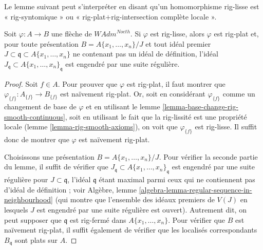 \noindent
Le lemme suivant peut s'interpréter en disant qu'un homomorphisme rig-lisse
est « rig-syntomique » ou « rig-plat$+$rig-intersection complète locale ».

\begin{lemma}
\label{lemma-rig-smooth-rig-flat}
Soit $\varphi : A \to B$ une flèche de $\textit{WAdm}^{Noeth}$.
Si $\varphi$ est rig-lisse, alors $\varphi$ est rig-plat et,
pour toute présentation $B = A\{x_1, \ldots, x_n\}/J$
et tout idéal premier $J \subset \mathfrak q \subset A\{x_1, \ldots, x_n\}$
ne contenant pas un idéal de définition, l'idéal
$J_\mathfrak q \subset A\{x_1, \ldots, x_n\}_\mathfrak q$
est engendré par une suite régulière.
\end{lemma}

\begin{proof}
Soit $f \in A$. Pour prouver que $\varphi$ est rig-plat, il faut montrer
que $\varphi_{\{f\}} : A_{\{f\}} \to B_{\{f\}}$ est naïvement rig-plat.
Or, soit en considérant $\varphi_{\{f\}}$ comme un changement de base de $\varphi$
et en utilisant le lemme \ref{lemma-base-change-rig-smooth-continuous},
soit en utilisant le fait que la rig-lissité
est une propriété locale (lemme \ref{lemma-rig-smooth-axioms}), on voit que
$\varphi_{\{f\}}$ est rig-lisse. Il suffit donc de montrer
que $\varphi$ est naïvement rig-plat.

\medskip\noindent
Choisissons une présentation $B = A\{x_1, \ldots, x_n\}/J$.
Pour vérifier la seconde partie du lemme, il suffit
de vérifier que $J_\mathfrak q \subset A\{x_1, \ldots, x_n\}_\mathfrak q$
est engendré par une suite régulière pour $J \subset \mathfrak q$,
l'idéal $\mathfrak q$ étant maximal parmi ceux qui ne contiennent pas
d'idéal de définition ; voir
Algèbre, lemme \ref{algebra-lemma-regular-sequence-in-neighbourhood}
(qui montre que l'ensemble des idéaux premiers de $V(J)$ en lesquels
$J$ est engendré par une suite régulière est ouvert).
Autrement dit, on peut supposer que $\mathfrak q$ est rig-fermé
dans $A\{x_1, \ldots, x_n\}$. Pour vérifier que
$B$ est naïvement rig-plat, il suffit également de
vérifier que les localisés correspondants $B_\mathfrak q$
sont plats sur $A$.


\end{proof}
